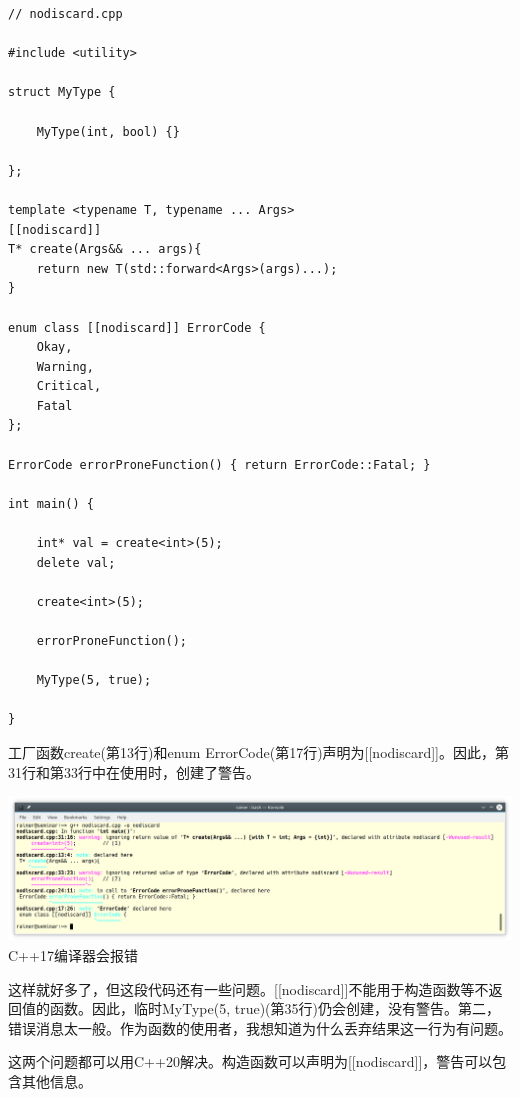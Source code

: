 \begin{lstlisting}[style=styleCXX]
// nodiscard.cpp

#include <utility>

struct MyType {

	MyType(int, bool) {}

};

template <typename T, typename ... Args>
[[nodiscard]]
T* create(Args&& ... args){
	return new T(std::forward<Args>(args)...);
}

enum class [[nodiscard]] ErrorCode {
	Okay,
	Warning,
	Critical,
	Fatal
};

ErrorCode errorProneFunction() { return ErrorCode::Fatal; }

int main() {

	int* val = create<int>(5);
	delete val;
	
	create<int>(5);
	
	errorProneFunction();
	
	MyType(5, true);

}
\end{lstlisting}

工厂函数create(第13行)和enum ErrorCode(第17行)声明为[[nodiscard]]。因此，第31行和第33行中在使用时，创建了警告。

\begin{center}
\includegraphics[width=1.0\textwidth]{content/3/chapter4/images/45.png}\\
C++17编译器会报错
\end{center}

这样就好多了，但这段代码还有一些问题。[[nodiscard]]不能用于构造函数等不返回值的函数。因此，临时MyType(5, true)(第35行)仍会创建，没有警告。第二，错误消息太一般。作为函数的使用者，我想知道为什么丢弃结果这一行为有问题。

这两个问题都可以用C++20解决。构造函数可以声明为[[nodiscard]]，警告可以包含其他信息。

